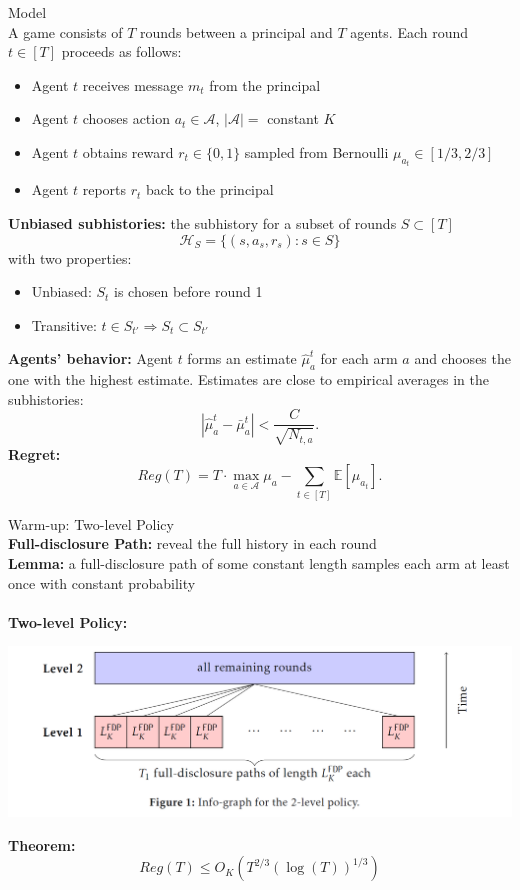 \documentclass[final]{beamer}
\begin{document}
\begin{frame}[t]
\begin{columns}[t]
\begin{column}{.44\textwidth}
\begin{block}{Model}
~\\
A game consists of $T$ rounds between a principal and $T$ agents. Each round $t \in[T]$ proceeds as follows:
\begin{itemize}
\item Agent $t$ receives message $m_t$ from the principal
\item Agent $t$ chooses action $a_t \in \mathcal{A}$, $|\mathcal{A}| = $ constant $K$
\item Agent $t$ obtains reward $r_t \in \{0,1\}$ sampled from Bernoulli $\mu_{a_t} \in [1/3,2/3]$ 
\item Agent $t$ reports $r_t$ back to the principal
\end{itemize}
\textbf{Unbiased subhistories:} the subhistory for a subset of rounds $S \subset [T]$
$$\mathcal{H}_{S} = \{ (s,a_s,r_s): s \in S \}$$
with two properties:
\begin{itemize}
\item Unbiased: $S_t$ is chosen before round 1
\item Transitive: $t \in S_{t'} \Rightarrow S_t \subset S_{t'}$
\end{itemize}
\textbf{Agents' behavior:} Agent $t$ forms an estimate $\hat{\mu}_a^t$ for each arm $a$  and chooses the one with the highest estimate. Estimates are close to empirical averages in the subhistories:
\[
|\hat{\mu}_a^t- \bar{\mu}_a^t| < \frac{C}{\sqrt{N_{t,a}}}. 
\]
\textbf{Regret:}
\[
Reg(T) = T\cdot \max_{a \in \mathcal{A}} \mu_a - \sum_{t \in [T]} \mathbb{E}[\mu_{a_t}].
\]
\end{block}

\begin{block}{Warm-up: Two-level Policy}
~\\
\textbf{Full-disclosure Path:} reveal the full history in each round\\
\textbf{Lemma:} a full-disclosure path of some constant length samples each arm at least once with constant probability \\
~\\
\textbf{Two-level Policy:}
\begin{center}
\includegraphics[width=0.99\linewidth]{2l.png} 
\end{center}
\textbf{Theorem:}
\[
Reg(T) \leq O_K (T^{2/3} (\log(T))^{1/3})
\]
\end{block}


\end{column}
\end{columns}
\end{frame}
\end{document}
